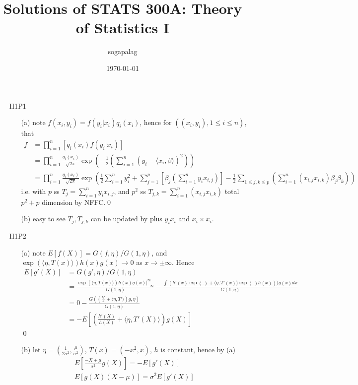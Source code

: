 \documentclass[paper=a4, fontsize=11pt]{scrartcl} %
\title{Solutions of STATS 300A: Theory of Statistics I}
\author{sogapalag}
\date{\normalsize\today}
\numberwithin{equation}{section} %
\numberwithin{figure}{section} %
\numberwithin{table}{section} %
\begin{document}
\maketitle
\begin{itemize}
	\item[H1P1]
	\begin{itemize}
		\item[(a)] note $f(x_i,y_i)= f(y_i|x_i)q_i(x_i)$, hence for $((x_i,y_i),1\leq i\leq n)$, that 
		\begin{align}
			f &= \prod_{i=1}^n [q_i(x_i)f(y_i|x_i)]\\
				&= \prod_{i=1}^n \frac{q_i(x_i)}{\sqrt{2\pi}} \exp(-\frac{1}{2}(\sum_{i=1}^n (y_i-\langle x_i,\beta\rangle)^2))\\
				&= \prod_{i=1}^n \frac{q_i(x_i)}{\sqrt{2\pi}} \exp (\frac{1}{2}\sum_{i=1}^n y_i^2 + \sum_{j=1}^p [\beta_j(\sum_{i=1}^n y_ix_{i,j})]  -\frac{1}{2} \sum_{1\leq j,k\leq p}(\sum_{i=1}^n(x_{i,j}x_{i,k})\beta_{j}\beta_k)     ) 
		\end{align}
		i.e. with $p$ ss $T_j = \sum_{i=1}^n y_i x_{i,j}$, and $p^2$ ss $T_{j,k} = \sum_{i=1}^n (x_{i,j}x_{i,k})$ total $p^2+p$ dimension by NFFC.\qed
		\item[(b)] easy to see $T_j,T_{j,k}$ can be updated by plus $y_ix_i$ and  $x_i\times x_i$.
	\end{itemize}
	\item[H1P2]
	\begin{itemize}
		\item[(a)] note $E[f(X)]=G(f,\eta)/G(1,\eta)$, and $\exp(\langle\eta,T(x)\rangle)h(x)g(x)\rightarrow 0$ as $x\rightarrow \pm\infty$. Hence
		\begin{align}
			E[g'(X)] &= G(g',\eta)/G(1,\eta)\\
				&= \frac{\exp(\langle\eta,T(x)\rangle)h(x)g(x)|_{-\infty}^\infty}{G(1,\eta)} - \frac{\int (h'(x)\exp(.)+ \langle \eta,T'(x)\rangle \exp(.)h(x)))g(x)dx}{G(1,\eta)}\\
				&= 0 - \frac{G((\frac{h'}{h}+ \langle \eta,T'\rangle)g,\eta)}{G(1,\eta)}\\
				&= - E[(\frac{h'(X)}{h(X)}+ \langle \eta,T'(X)\rangle)g(X)]
		\end{align}\qed
		\item[(b)] let $\eta = (\frac{1}{2\sigma^2}, \frac{\mu}{\sigma^2})$, $T(x)=(-x^2,x)$, $h$ is constant, hence by (a)
		\begin{align}
			E[\frac{-X+\mu}{\sigma^2} g(X)] = -E[g'(X)]\\
			E[g(X)(X-\mu)] = \sigma^2 E[g'(X)]

\end{align}
\end{itemize}
\end{itemize}
\end{document}
